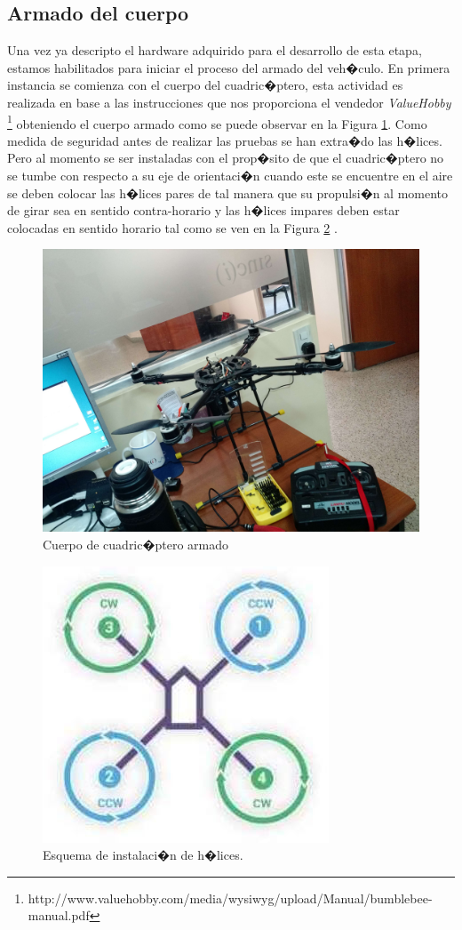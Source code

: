 	\subsection{Armado del cuerpo}
		Una vez ya descripto el hardware adquirido para el desarrollo de esta etapa,  estamos habilitados para iniciar el proceso del armado del veh�culo. En primera instancia se comienza con el cuerpo del cuadric�ptero, esta actividad  es realizada en base a las instrucciones que nos proporciona el vendedor \textit{ValueHobby} \footnote{http://www.valuehobby.com/media/wysiwyg/upload/Manual/bumblebee-manual.pdf} obteniendo el cuerpo armado como se puede observar en la Figura \ref{fig:armado}. Como medida de seguridad antes de realizar las pruebas se han extra�do las h�lices. Pero al momento se ser instaladas con el prop�sito de que el cuadric�ptero no se tumbe con respecto a su eje de orientaci�n cuando este se encuentre en el aire se deben colocar las h�lices pares de tal manera que su propulsi�n al momento de girar sea en sentido contra-horario y las h�lices impares deben estar colocadas en sentido horario tal como se ven en la Figura \ref{fig:esquemacuadricoptero} . 
		
		\begin{figure}[h!]
			\centering
			\includegraphics[width=0.6\linewidth, height=0.3\textheight]{Imagenes/fotos/Armado}
			\caption{Cuerpo de cuadric�ptero armado}
			\label{fig:armado}
		\end{figure}
		
		\begin{figure}[h!]
			\centering
			\includegraphics[width=0.3\linewidth, height=0.2\textheight]{Imagenes/esquemacuadricoptero}
			\caption{Esquema de instalaci�n de h�lices.}
			\label{fig:esquemacuadricoptero}
		\end{figure}

